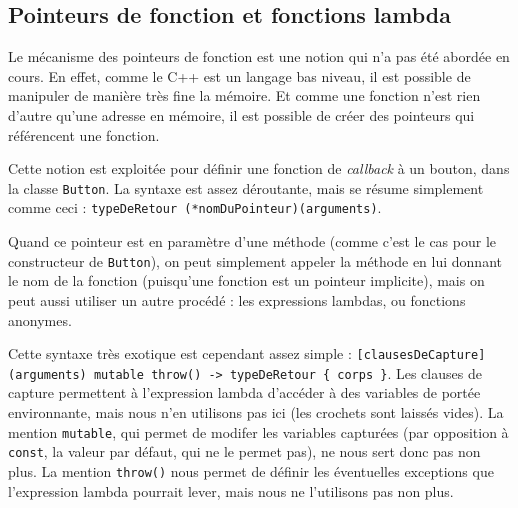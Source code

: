 \documentclass[a4paper,10pt]{report}
\begin{document}
\subsection{Pointeurs de fonction et fonctions lambda}
Le mécanisme des pointeurs de fonction est une notion qui n'a pas été abordée en cours. En effet, comme le C++ est un langage bas niveau, il est possible de manipuler de manière très fine la mémoire. Et comme une fonction n'est rien d'autre qu'une adresse en mémoire, il est possible de créer des pointeurs qui référencent une fonction.

Cette notion est exploitée pour définir une fonction de \textit{callback} à un bouton, dans la classe \texttt{Button}. La syntaxe est assez déroutante, mais se résume simplement comme ceci : \texttt{typeDeRetour (*nomDuPointeur)(arguments)}.

Quand ce pointeur est en paramètre d'une méthode (comme c'est le cas pour le constructeur de \texttt{Button}), on peut simplement appeler la méthode en lui donnant le nom de la fonction (puisqu'une fonction est un pointeur implicite), mais on peut aussi utiliser un autre procédé : les expressions lambdas, ou fonctions anonymes.

Cette syntaxe très exotique est cependant assez simple : \texttt{[clausesDeCapture] (arguments) mutable throw() -> typeDeRetour \{ corps \}}. Les clauses de capture permettent à l'expression lambda d'accéder à des variables de portée environnante, mais nous n'en utilisons pas ici (les crochets sont laissés vides). La mention \texttt{mutable}, qui permet de modifer les variables capturées (par opposition à \texttt{const}, la valeur par défaut, qui ne le permet pas), ne nous sert donc pas non plus. La mention \texttt{throw()} nous permet de définir les éventuelles exceptions que l'expression lambda pourrait lever, mais nous ne l'utilisons pas non plus. 
\end{document}

